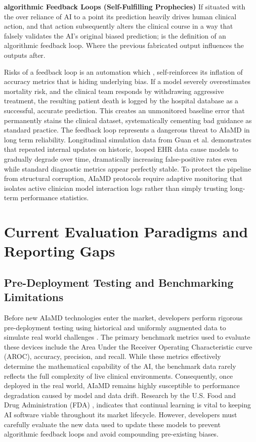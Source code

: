 \documentclass[11pt,a4paper]{article}
\begin{document}
\textbf{algorithmic Feedback Loops (Self-Fulfilling Prophecies)}
If situated with the over reliance of AI to a point its prediction heavily drives human clinical action, and that action subsequently alters the clinical course in a way that falsely validates the AI's original biased prediction; is the definition of an algorithmic feedback loop. Where the previous fabricated output influences the outputs after. \cite{guan2026}

Risks of a feedback loop is an automation which , self-reinforces its inflation of accuracy metrics that is hiding underlying bias. If a model severely overestimates mortality risk, and the clinical team responds by withdrawing aggressive treatment, the resulting patient death is logged by the hospital database as a successful, accurate prediction. This creates an unmonitored baseline error that permanently stains the clinical dataset, systematically cementing bad guidance as standard practice.
The feedback loop represents a dangerous threat to AIaMD in long term reliability. Longitudinal simulation data from Guan et al. \cite{guan2026} demonstrates that repeated internal updates on historic, looped EHR data cause models to gradually degrade over time, dramatically increasing false-positive rates even while standard diagnostic metrics appear perfectly stable. To protect the pipeline from structural corruption, AIaMD protocols require adaptive monitoring that isolates active clinician model interaction logs rather than simply trusting long-term performance statistics.




\section{Current Evaluation Paradigms and Reporting Gaps}
\label{sec:Current Evaluation Paradigms and Reporting Gaps}

\subsection{Pre-Deployment Testing and Benchmarking Limitations}
\label{sec:Pre-Deployment Testing and Benchmarking Limitations}

Before new AIaMD technologies enter the market, developers perform rigorous pre-deployment testing using historical and uniformly augmented data to simulate real world challenges \cite{guan2026} . The primary benchmark metrics used to evaluate these devices include the Area Under the Receiver Operating Characteristic curve (AROC), accuracy, precision, and recall. While these metrics effectively determine the mathematical capability of the AI, the benchmark data rarely reflects the full complexity of live clinical environments. Consequently, once deployed in the real world, AIaMD remains highly susceptible to performance degradation caused by model and data drift. Research by the U.S. Food and Drug Administration (FDA) \cite{vokinger2021continual} \cite{fda2019artificial} , indicates that continual learning is vital to keeping AI software viable throughout its market lifecycle. However, developers must carefully evaluate the new data used to update these models to prevent algorithmic feedback loops and avoid compounding pre-existing biases. 
\end{document}
